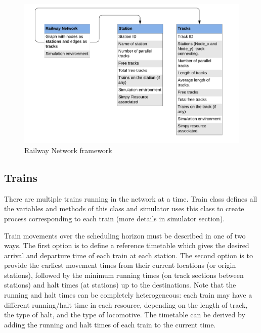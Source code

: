 \begin{figure}[h]
    \centering
    \includegraphics[width=1.0\textwidth]{Rail_train}
    \caption{ Railway Network framework }
    \label{image-myimage2}
\end{figure}

\subsection{Trains}
There are multiple trains running in the network at a time. Train class defines all the variables and methods
of this class and simulator uses this class to create process corresponding to each train (more details in simulator 
section).

\vspace{0.25cm}
Train movements over the scheduling horizon must be described in one of two ways. The first option is
to define a reference timetable which gives the desired arrival
and departure time of each train at each station. The second
option is to provide the earliest movement times from their
current locations (or origin stations), followed by the minimum
running times (on track sections between stations) and halt
times (at stations) up to the destinations. Note that the running
and halt times can be completely heterogeneous: each train
may have a different running/halt time in each resource,
depending on the length of track, the type of halt, and the
type of locomotive. The timetable can be derived by adding
the running and halt times of each train to the current time.

